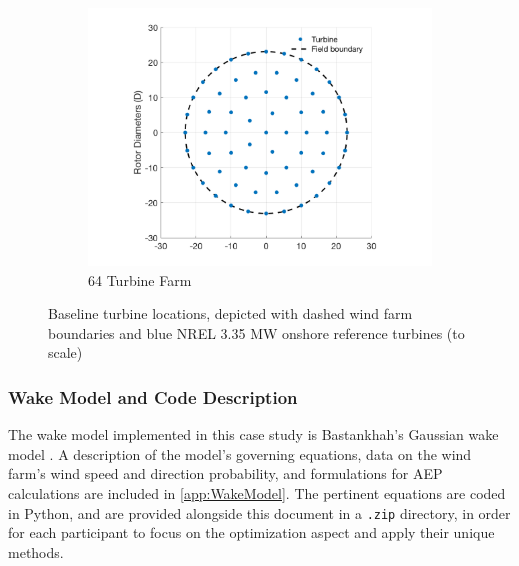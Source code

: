 \documentclass[12pt]{article}
\begin{document}
\begin{figure}[H]
            \medskip
            
            \begin{subfigure}[t]{.49\textwidth}
            \centering
            \vspace{0pt}%
            \includegraphics[width=\linewidth]{BaseCase64.png}
            \caption{64 Turbine Farm} \label{fig:BaseLoc64}
        \end{subfigure}
        \begin{minipage}[t]{.49\textwidth}
            \vspace{20pt}
            \caption{Baseline turbine locations, depicted with dashed wind farm boundaries and blue NREL 3.35 MW onshore reference turbines (to scale)}
            \label{fig:BaseLocOpt}
        \end{minipage}
    \end{figure}


\subsubsection{Wake Model and Code Description}
The wake model implemented in this case study is Bastankhah’s Gaussian wake model \cite{Thomas2018, Bastankhah2014, Bastankhah2016}. A description of the model's governing equations, data on the wind farm's wind speed and direction probability, and formulations for AEP calculations are included in \cref{app:WakeModel}. The pertinent equations are coded in Python, and are provided alongside this document in a \texttt{.zip} directory, in order for each participant to focus on the optimization aspect and apply their unique methods.
\end{document}
